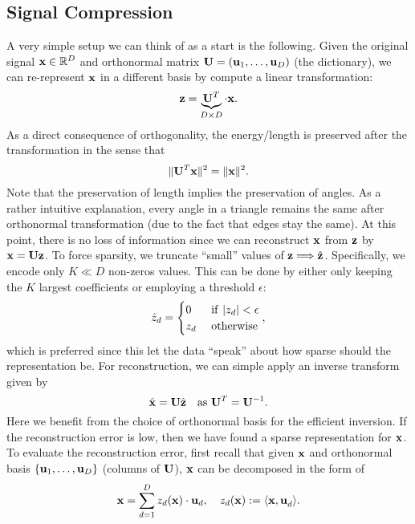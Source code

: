 \documentclass[../main.tex]{subfiles}
\begin{document}
\subsection{Signal Compression}
A very simple setup we can think of as a start is the following. Given the original signal ${\bf x}\in \mathbb{R}^D$ and orthonormal matrix ${\bf U}=({\bf u}_1,\dots,{\bf u}_D)$ (the dictionary), we can re-represent ${\bf x}$ in a different basis by compute a linear transformation:
\begin{equation*}
{\bf z}=\underbrace{{\bf U}^T}_{D\times D}\cdot {\bf x}.
\end{equation*}
As a direct consequence of orthogonality, the energy/length is preserved after the transformation in the sense that
\begin{equation*}
\|{\bf U}^T{\bf x}\|^2 = \|{\bf x}\|^2.
\end{equation*}
Note that the preservation of length implies the preservation of angles. As a rather intuitive explanation, every angle in a triangle remains the same after orthonormal transformation (due to the fact that edges stay the same). At this point, there is no loss of information since we can reconstruct ${\bf x}$ from ${\bf z}$ by ${\bf x}={\bf Uz}$. To force sparsity, we truncate ``small'' values of ${\bf z}\Longrightarrow\hat{\bf z}$. Specifically, we encode only $K\ll D$ non-zeros values. This can be done by either only keeping the $K$ largest coefficients or employing a threshold $\epsilon$:
\begin{equation*}
\hat{z}_d=\begin{cases}
0 &\ {\rm if}\ |z_d|<\epsilon\\
z_d&\ {\rm otherwise}
\end{cases},
\end{equation*}
which is preferred since this let the data ``speak'' about how sparse should the representation be. For reconstruction, we can simple apply an inverse transform given by
\begin{equation*}
\hat{\bf x}={\bf U}\hat{\bf z}\quad{\rm as}\ {\bf U}^T={\bf U}^{-1}.
\end{equation*}
Here we benefit from the choice of orthonormal basis for the efficient inversion. If the reconstruction error is low, then we have found a sparse representation for ${\bf x}$. To evaluate the reconstruction error, first recall that given ${\bf x}$ and orthonormal basis $\{{\bf u}_1,\dots,{\bf u}_D\}$ (columns of ${\bf U}$), ${\bf x}$ can be decomposed in the form of
\begin{equation*}
{\bf x}=\sum_{d=1}^{D}z_d({\bf x})\cdot {\bf u}_d,\quad z_d({\bf x}):=\langle {\bf x,u}_d\rangle.
\end{equation*}
\end{document}
